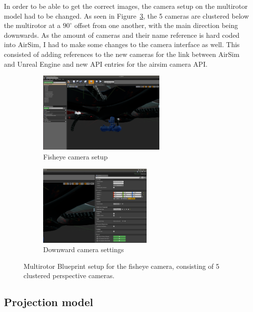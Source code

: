 In order to be able to get the correct images, the camera setup on the multirotor model had to be changed. As seen in Figure~\ref{fig:new_Blueprint_multirotor}, the 5 cameras are clustered below the multirotor at a $90^\circ$ offset from one another, with the main direction being downwards. As the amount of cameras and their name reference is hard coded into AirSim, I had to make some changes to the camera interface as well. This consisted of adding references to the new cameras for the link between AirSim and Unreal Engine and new API entries for the airsim camera API.

\begin{figure}[!htb]
    \centering
    \begin{subfigure}{0.45\linewidth}
        \centering
        \includegraphics[height=4cm]{rapport/fig/Simulator/camera_setup.png}
        \caption{Fisheye camera setup}
        \label{fig:new_Blueprint_cameras}
    \end{subfigure}
    \begin{subfigure}{0.45\linewidth}
        \centering
        \includegraphics[height=4cm]{rapport/fig/Simulator/camera_setting.png}
        \caption{Downward camera settings}
        \label{fig:new_Blueprint_nodes}
    \end{subfigure}
    \caption{Multirotor Blueprint setup for the fisheye camera, consisting of 5 clustered perspective cameras.}
    \label{fig:new_Blueprint_multirotor}
\end{figure}

\subsection{Projection model}

